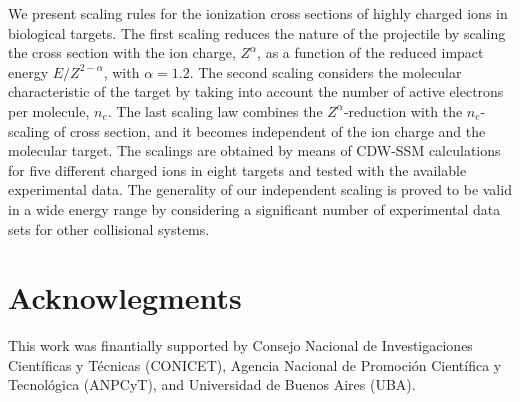 \documentclass[10pt,showpacs,showkeys,twocolumn]{revtex4-1}
\begin{document}
We present scaling rules for the ionization
cross sections of highly charged ions in biological targets. The first
scaling reduces the nature of the projectile by scaling the cross 
section with the ion charge, $Z^{\alpha}$, as a function of the 
reduced impact energy $E/Z^{2-\alpha}$, with $\alpha=1.2$. The second
scaling considers the molecular characteristic of the target by taking 
into account the number of active electrons per molecule, $n_e$. 
The last scaling law combines the $Z^{\alpha}$-reduction with the
$n_e$-scaling 
of cross section, and it becomes independent of the ion charge and 
the molecular target. The scalings are obtained by means of 
CDW-SSM calculations for five different charged ions in eight targets 
and tested with the available experimental data. The generality of our
independent scaling is proved to be valid in a wide energy range 
by considering a significant number of experimental data sets for 
other collisional systems.

\section{Acknowlegments}

This work was finantially supported by Consejo Nacional de
Investigaciones Cient\'ificas y T\'ecnicas (CONICET), Agencia 
Nacional de Promoci\'on Cient\'ifica y Tecnol\'ogica (ANPCyT), 
and Universidad de Buenos Aires (UBA).
\end{document}
